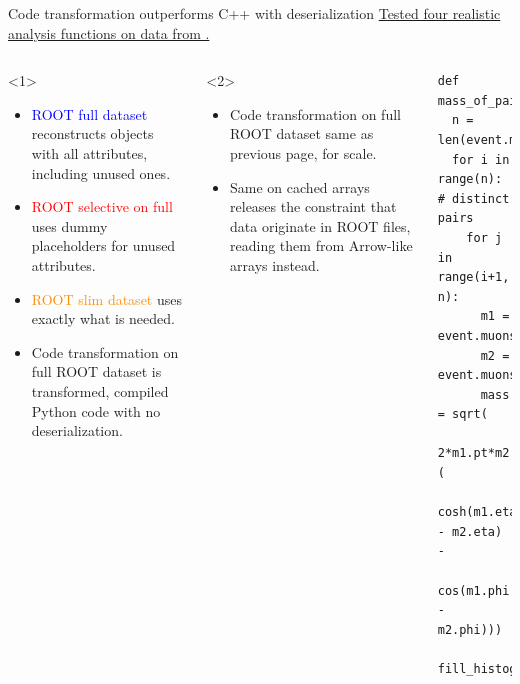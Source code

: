 \documentclass[aspectratio=169]{beamer}
\begin{document}
\begin{frame}[fragile]{Code transformation outperforms C++ with deserialization}
\vspace{0.25 cm}
\underline{Tested four realistic analysis functions on data from .}

\begin{columns}
\vspace{-0.2 cm}
\begin{columns}
\scriptsize
\begin{onlyenv}<1>
\begin{itemize}
\item \textcolor{blue}{ROOT full dataset} reconstructs objects with all attributes, including unused ones.
\item \textcolor{red}{ROOT selective on full} uses dummy placeholders for unused attributes.
\item \textcolor{darkorange}{ROOT slim dataset} uses exactly what is needed.
\item \textcolor{darkdarkgreen}{Code transformation on full ROOT dataset} is transformed, compiled Python code with no deserialization.
\end{itemize}
\end{onlyenv}
\begin{onlyenv}<2>
\begin{itemize}
\item \textcolor{darkdarkgreen}{Code transformation on full ROOT dataset} same as previous page, for scale.
\item \textcolor{mauve}{Same on cached arrays} releases the constraint that data originate in ROOT files, reading them from Arrow-like arrays instead.
\end{itemize}
\vspace{0.9 cm}
\end{onlyenv}
\end{columns}

\vspace{0.15 cm}
\scriptsize
\begin{verbatim}
def mass_of_pairs(event):
  n = len(event.muons)
  for i in range(n):  # distinct pairs
    for j in range(i+1, n):
      m1 = event.muons[i]
      m2 = event.muons[j]
      mass = sqrt(
        2*m1.pt*m2.pt*(
        cosh(m1.eta - m2.eta) -
        cos(m1.phi - m2.phi)))
      fill_histogram(mass)
\end{verbatim}


\end{columns}
\end{frame}
\end{document}
